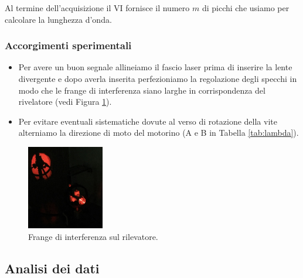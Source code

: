 \documentclass[a4paper]{article}
\begin{document}
\begin{multicols}{2}

Al termine dell'acquisizione il VI fornisce il numero $m$ di picchi che usiamo per calcolare la lunghezza d'onda.

\subsubsection{Accorgimenti sperimentali}
\begin{itemize}
	\item Per avere un buon segnale allineiamo il fascio laser prima di inserire la lente divergente e dopo averla inserita perfezioniamo la regolazione degli specchi in modo che le frange di interferenza siano larghe in corrispondenza del rivelatore (vedi Figura \ref{fig:frange}).
	
	\item Per evitare eventuali sistematiche dovute al verso di rotazione della vite alterniamo la direzione di moto del motorino (A e B in Tabella \ref{tab:lambda}).
\end{itemize}

\begin{figure}[H]
	\centering
	\includegraphics[width=0.3\textwidth]{frange.jpg}
	\caption{Frange di interferenza sul rilevatore.}
	\label{fig:frange}
\end{figure}

\subsection{Analisi dei dati}

\end{multicols}
\end{document}
